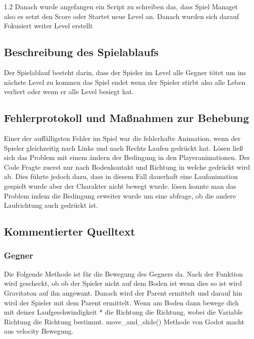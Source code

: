 \documentclass{article}
\makeatletter
\newcommand\subsubsubsection{\@startsection{paragraph}{4}{\z@}{-2.5ex\@plus -1ex \@minus -.25ex}{1.25ex \@plus .25ex}{\normalfont\normalsize\bfseries}}
\newcommand{\Zeilenabstand}{1.2}
\makeatother
\begin{document}
\begin{spacing}{\Zeilenabstand}
Danach wurde angefangen ein Script zu schreiben das, dass Spiel Managet also es setzt den Score oder 
Startet neue Level an. Danach wurden sich darauf Fokusiert weiter Level erstellt

\newpage
\subsection{Beschreibung des Spielablaufs}

Der Spielablauf besteht darin, dass der Spieler im Level alle Gegner tötet um ins nächste Level zu kommen
das Spiel endet wenn der Spieler stirbt also alle Leben verliert oder wenn er alle Level besiegt hat.


\subsection{Fehlerprotokoll und Maßnahmen zur Behebung}

Einer der auffälligsten Fehler im Spiel war die fehlerhafte Animation, wenn der Spieler gleichzeitig nach Links und nach Rechts Laufen gedrückt hat. Lösen ließ sich das Problem mit einem ändern der Bedingung in den Playeranimationen. Der Code Fragte zuerst nur nach Bodenkontakt und Richtung in welche gedrückt wird ab. Dies führte jedoch dazu, dass in diesem Fall dauerhaft eine Laufanimation gespielt wurde aber der Charakter nicht bewegt wurde. lösen konnte man das Problem indem die Bedingung erweiter wurde um eine abfrage, ob die andere Laufrichtung auch gedrückt ist. \\


\newpage
\subsection{Kommentierter Quelltext}

\subsubsection{Gegner}

\subsubsubsection{Gegner Bewegung}

Die Folgende Methode ist für die Bewegung des Gegners da. Nach der Funktion wird gescheckt, ob
ob der Spieler nicht auf dem Boden ist wenn dies so ist wird Gravitaton auf ihn angewant. 
Danach wird der Parent ermittelt und darauf hin wird der Spieler mit dem Parent ermittelt.
Wenn am Boden dann bewege dich mit deiner Laufgeschwindigkeit * die Richtung die Richtung, wobei 
die Variable Richtung die Richtung bestimmt. move\_and\_slide() Methode von Godot macht
aus velocity Bewegung.


\end{spacing}
\end{document}
